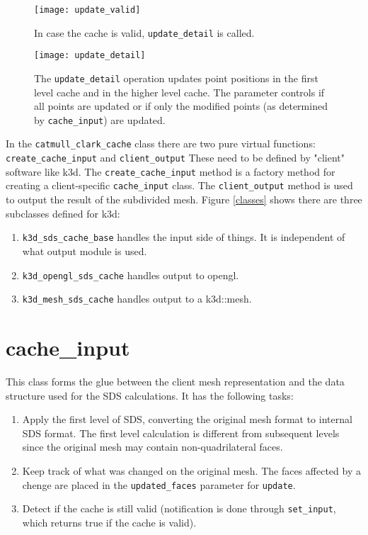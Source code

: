 \documentclass[11pt]{article} %
\renewcommand{\[}{\begin{equation}}
\renewcommand{\]}{\end{equation}}
\renewcommand{\(}{\begin{displaymath}}
\renewcommand{\)}{\end{displaymath}}
\begin{document}
\begin{figure}[H]
	\centering
	\texttt{[image: update\_valid]}
	\caption{In case the cache is valid, \texttt{update\_detail} is called.}
	\label{update_valid}
\end{figure}

\begin{figure}[H]
	\centering
	\texttt{[image: update\_detail]}
	\caption{The \texttt{update\_detail} operation updates point positions in the first level cache and in the higher level cache. The parameter controls if all points are updated or if only the modified points (as determined by \texttt{cache\_input}) are updated.}
	\label{update_detail}
\end{figure}

In the \texttt{catmull\_clark\_cache} class there are two pure virtual functions: \texttt{create\_cache\_input} and \texttt{client\_output} These need to be defined by "client" software like k3d. The \texttt{create\_cache\_input} method is a factory method for creating a client-specific \texttt{cache\_input} class. The \texttt{client\_output} method is used to output the result of the subdivided mesh. Figure \ref{classes} shows there are three subclasses defined for k3d:
\begin{enumerate}
\item \texttt{k3d\_sds\_cache\_base} handles the input side of things. It is independent of what output module is used.
\item \texttt{k3d\_opengl\_sds\_cache} handles output to opengl.
\item \texttt{k3d\_mesh\_sds\_cache} handles output to a k3d::mesh.
\end{enumerate}

\section{cache\_input}
This class forms the glue between the client mesh representation and the data structure used for the SDS calculations. It has the following tasks:
\begin{enumerate}
\item Apply the first level of SDS, converting the original mesh format to internal SDS format. The first level calculation is different from subsequent levels since the original mesh may contain non-quadrilateral faces.
\item Keep track of what was changed on the original mesh. The faces affected by a chenge are placed in the \texttt{updated\_faces} parameter for \texttt{update}.
\item Detect if the cache is still valid (notification is done through \texttt{set\_input}, which returns true if the cache is valid).
\end{enumerate}
\end{document}
